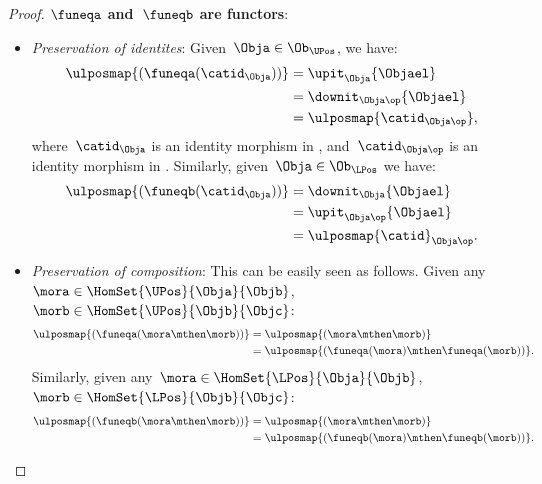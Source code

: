 \begin{proof}
	\textbf{$\funeqa$ and~$\funeqb$ are functors}:
	\begin{itemize}
		\item \emph{Preservation of identites}: Given~$\Obja\in \Ob_{\UPos}$, we have:
		      \begin{equation*}
			      \begin{aligned}
				      \ulposmap{(\funeqa(\catid_\Obja))} & =\upit_\Obja\{\Objael\}        \\
				                                         & =\downit_{\Obja\op}\{\Objael\} \\
				                                         & =\ulposmap{\catid_{\Obja\op}},
			      \end{aligned}
		      \end{equation*}
		      where~$\catid_\Obja$ is an identity morphism in \UPos, and~$\catid_{\Obja\op}$ is an identity morphism in \LPos.
		      Similarly, given~$\Obja\in \Ob_{\LPos}$ we have:
		      \begin{equation*}
			      \begin{aligned}
				      \ulposmap{(\funeqb(\catid_\Obja))} & =\downit_\Obja\{\Objael\}      \\
				                                         & =\upit_{\Obja\op}\{\Objael\}   \\
				                                         & =\ulposmap{\catid}_{\Obja\op}.
			      \end{aligned}
		      \end{equation*}
		\item \emph{Preservation of composition}: This can be easily seen as follows.
		      Given any~$\mora\in \HomSet{\UPos}{\Obja}{\Objb}$,~$\morb\in \HomSet{\UPos}{\Objb}{\Objc}$:
		      \begin{equation*}
			      \begin{aligned}
				      \ulposmap{(\funeqa(\mora \mthen \morb))} & =\ulposmap{(\mora\mthen \morb)}                    \\
				                                               & =\ulposmap{(\funeqa(\mora)\mthen \funeqa(\morb))}.
			      \end{aligned}
		      \end{equation*}
		      Similarly, given any~$\mora\in \HomSet{\LPos}{\Obja}{\Objb}$,~$\morb\in \HomSet{\LPos}{\Objb}{\Objc}$:
		      \begin{equation*}
			      \begin{aligned}
				      \ulposmap{(\funeqb(\mora \mthen \morb))} & =\ulposmap{(\mora \mthen \morb)}                   \\
				                                               & =\ulposmap{(\funeqb(\mora)\mthen \funeqb(\morb))}.
			      \end{aligned}
		      \end{equation*}
	\end{itemize}


\end{proof}
